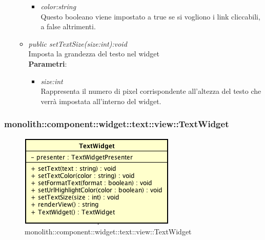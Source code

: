 \begin{itemize}
\begin{itemize}
\begin{itemize}
		\item \textit{color:string}\\
		Questo booleano viene impostato a true se si vogliono i link cliccabili, a false altrimenti.
		\end{itemize} 
	\item \textit{public setTextSize(size:int):void}\\
	Imposta la grandezza del testo nel widget
		\\ \textbf{Parametri}: \begin{itemize}
		\item \textit{size:int}\\
		Rappresenta il numero di pixel corrispondente all'altezza del testo che verrà impostata all'interno del widget.
		\end{itemize} 
	\end{itemize}
\end{itemize}

\subsubsection{monolith::component::widget::text::view::TextWidget}

\label{monolith::component::widget::text::view::TextWidget}
\begin{figure}[H]
	\centering
	\includegraphics[scale=0.5]{Sezioni/SottosezioniST/img/TextWidget.png}
	\caption{monolith::component::widget::text::view::TextWidget}
\end{figure}

